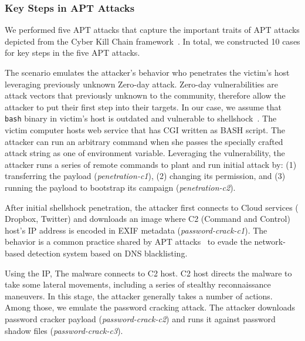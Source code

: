 \subsubsection{Key Steps in APT Attacks}
\label{subsubsec:attack-cases}

We performed five APT attacks that capture the important traits of APT attacks depicted from the Cyber Kill Chain framework~\cite{cyberkillchain}. 
In total, we constructed 10 cases for key steps in the five APT attacks.


The scenario emulates the attacker's behavior who penetrates the victim's host
leveraging previously unknown Zero-day attack. Zero-day vulnerabilities are
attack vectors that previously unknown to the community, therefore allow the
attacker to put their first step into their targets. In our case, we assume that
{\tt bash} binary in victim's host is outdated and vulnerable to shellshock~\cite{shellshock}. The victim computer hosts web service that has
CGI written as BASH script. The attacker can run an arbitrary command when she
passes the specially crafted attack string as one of environment variable. Leveraging the vulnerability, the attacker runs a series of remote commands to
plant and run initial attack by: (1) transferring the payload (\emph{penetration-c1}), (2) changing its permission, and (3) running the payload to bootstrap its campaign (\emph{penetration-c2}).


After initial shellshock penetration, the attacker first connects to Cloud services (\eg
Dropbox, Twitter) and downloads an image where C2 (Command and Control) host's IP address is encoded in EXIF metadata (\emph{password-crack-c1}). The behavior is a common practice shared by APT attacks~\cite{hammertoss,vpnfilter} to evade the network-based detection system based on DNS blacklisting.

Using the IP, The malware connects to C2 host. C2 host directs the malware to take
some lateral movements, including a series of stealthy reconnaissance maneuvers. 
In this stage, the attacker generally takes a number of actions. Among those, we emulate the password cracking attack. The attacker downloads password cracker payload (\emph{password-crack-c2}) and runs it against password shadow files (\emph{password-crack-c3}).


